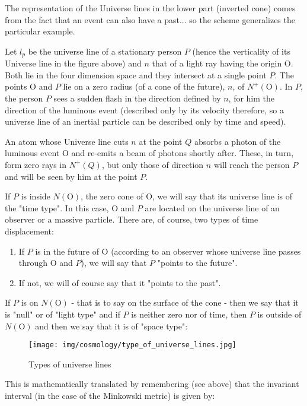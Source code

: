 	\begin{tcolorbox}[title=Remark,colframe=black,arc=10pt]
	The representation of the Universe lines in the lower part (inverted cone) comes from the fact that an event can also have a past... so the scheme generalizes the particular example.
	\end{tcolorbox}	
	Let $l_p$ be the universe line of a stationary person $P$ (hence the verticality of its Universe line in the figure above) and $n$ that of a light ray having the origin O. Both lie in the four dimension space and they intersect at a single point $P$. The points O and $P$ lie on a zero radius (of a cone of the future), $n$, of $N^{+}(\text{O})$. In $P$, the person $P$ sees a sudden flash in the direction defined by $n$, for him the direction of the luminous event (described only by its velocity therefore, so a universe line of an inertial particle can be described only by time and speed).
	
	An atom whose Universe line cuts $n$ at the point $Q$ absorbs a photon of the luminous event O and re-emits a beam of photons shortly after. These, in turn, form zero rays in $N^{+}(Q)$, but only those of direction $n$ will reach the person $P$ and will be seen by him at the point $P$.

	If $P$ is inside $N(\text{O})$, the zero cone of O, we will say that its universe line is of the "time type". In this case, O and $P$ are located on the universe line of an observer or a massive particle. There are, of course, two types of time displacement:
	\begin{enumerate}
		\item If $P$ is in the future of O (according to an observer whose universe line passes through O and $P$), we will say that $P$ "points to the future".

		\item If not, we will of course say that it "points to the past".
	\end{enumerate}
	If $P$ is on $N(\text{O})$ - that is to say on the surface of the cone - then we say that it is "null" or of "light type" and if $P$ is neither zero nor of time, then $P$ is outside of $N(\text{O})$ and then we say that it is of "space type":
	\begin{figure}[H]
		\centering
		\texttt{[image: img/cosmology/type\_of\_universe\_lines.jpg]}
		\caption{Types of universe lines}	
	\end{figure}
	This is mathematically translated by remembering (see above) that the invariant interval (in the case of the Minkowski metric) is given by:
	
